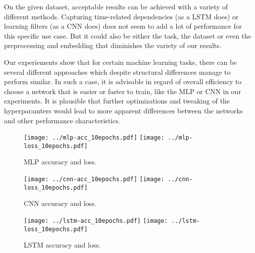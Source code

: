 \documentclass[conference]{IEEEtran}
\theoremstyle{plain}
\theoremstyle{definition}
\theoremstyle{remark}
\begin{document}
On the given dataset, acceptable results can be achieved with a variety of different methods. Capturing time-related dependencies (as a LSTM does) or learning filters (as a CNN does) does not seem to add a lot of performance for this specific use case. But it could also be either the task, the dataset or even the preprocessing and embedding that diminishes the variety of our results. 

Our experiements show that for certain machine learning tasks, there can be several different approaches which despite structural differences manage to perform similar. In such a case, it is advisable in regard of overall efficiency to choose a network that is easier or faster to train, like the MLP or CNN in our experiments. It is plausible that further optimizations and tweaking of the hyperparamters would lead to more apparent differences between the networks and other performance characteristics.

%



\begin{figure*}[tbh!]
	\centering
	\texttt{[image: ../mlp-acc\_10epochs.pdf]}
	\texttt{[image: ../mlp-loss\_10epochs.pdf]}
	\caption{MLP accuracy and loss.}
\end{figure*}
\begin{figure*}
	\centering
	\texttt{[image: ../cnn-acc\_10epochs.pdf]}
	\texttt{[image: ../cnn-loss\_10epochs.pdf]}
		\caption{CNN accuracy and loss.}
\end{figure*}
\begin{figure*}
	\centering
		\texttt{[image: ../lstm-acc\_10epochs.pdf]}
	\texttt{[image: ../lstm-loss\_10epochs.pdf]}
	\caption{LSTM accuracy and loss.}
\end{figure*}




%
\end{document}
